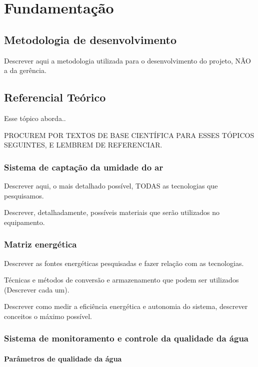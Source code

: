 \chapter[Fundamentação]{Fundamentação}

  \section{Metodologia de desenvolvimento}
  
  Descrever aqui a metodologia utilizada para o desenvolvimento do projeto, NÃO a da gerência.
  
  \section{Referencial Teórico}
  
    Esse tópico aborda..
    
    PROCUREM POR TEXTOS DE BASE CIENTÍFICA PARA ESSES TÓPICOS SEGUINTES, E LEMBREM DE REFERENCIAR.
    
    \subsection{Sistema de captação da umidade do ar}
    
    Descrever aqui, o mais detalhado possível, TODAS as tecnologias que pesquisamos.
    
    Descrever, detalhadamente, possíveis materiais que serão utilizados no equipamento.
    
    \subsection{Matriz energética}
    
    Descrever as fontes energéticas pesquisadas e fazer relação com as tecnologias.
    
    Técnicas e métodos de conversão e armazenamento que podem ser utilizados (Descrever cada um).
    
    Descrever como medir a eficiência energética e autonomia do sistema, descrever conceitos o máximo possível.
    
    \subsection{Sistema de monitoramento e controle da qualidade da água}
      
      \subsubsection{Parâmetros de qualidade da água}
      

